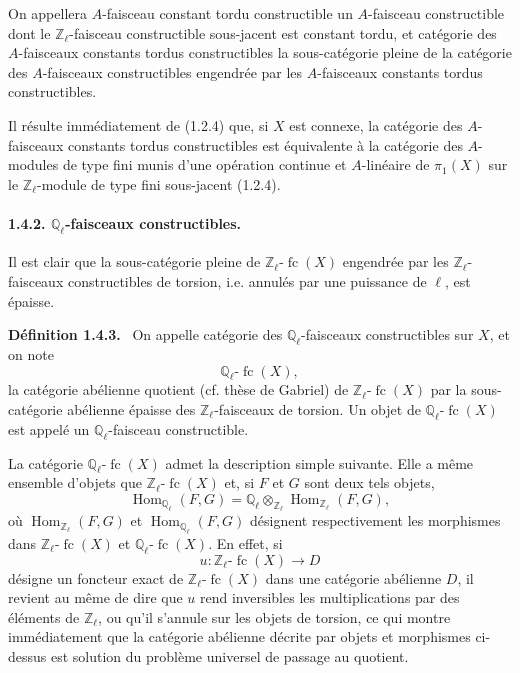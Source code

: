 \documentclass[11pt]{article}
\newenvironment{statement}[1]{\par\medskip\noindent\textbf{#1.}\ }{\par\medskip}
\DeclareMathOperator{\Hom}{Hom}
\providecommand{\Hom}{\operatorname{Hom}}
\providecommand{\fc}{\operatorname{fc}}
\providecommand{\Hom}{\operatorname{Hom}}
\begin{document}
On appellera \(A\)-faisceau constant tordu constructible un \(A\)-faisceau constructible dont le \(\mathbb Z_\ell\)-faisceau constructible sous-jacent est constant tordu, et catégorie des \(A\)-faisceaux constants tordus constructibles la sous-catégorie pleine de la catégorie des \(A\)-faisceaux constructibles engendrée par les \(A\)-faisceaux constants tordus constructibles.

Il résulte immédiatement de (1.2.4) que, si \(X\) est connexe, la catégorie des \(A\)-faisceaux constants tordus constructibles est équivalente à la catégorie des \(A\)-modules de type fini munis d'une opération continue et \(A\)-linéaire de \(\pi_1(X)\) sur le \(\mathbb Z_\ell\)-module de type fini sous-jacent (1.2.4).

\paragraph{1.4.2. \(\mathbb Q_\ell\)-faisceaux constructibles.}
Il est clair que la sous-catégorie pleine de \(\mathbb Z_\ell\text{-}\fc(X)\) engendrée par les \(\mathbb Z_\ell\)-faisceaux constructibles de torsion, i.e. annulés par une puissance de \(\ell\), est épaisse.

\begin{statement}{Définition 1.4.3}
On appelle catégorie des \(\mathbb Q_\ell\)-faisceaux constructibles sur \(X\), et on note
\[
\mathbb Q_\ell\text{-}\fc(X),
\]
la catégorie abélienne quotient (cf. thèse de Gabriel) de \(\mathbb Z_\ell\text{-}\fc(X)\) par la sous-catégorie abélienne épaisse des \(\mathbb Z_\ell\)-faisceaux de torsion. Un objet de \(\mathbb Q_\ell\text{-}\fc(X)\) est appelé un \(\mathbb Q_\ell\)-faisceau constructible.
\end{statement}

La catégorie \(\mathbb Q_\ell\text{-}\fc(X)\) admet la description simple suivante. Elle a même ensemble d'objets que \(\mathbb Z_\ell\text{-}\fc(X)\) et, si \(F\) et \(G\) sont deux tels objets,
\[
\Hom_{\mathbb Q_\ell}(F,G)
=\mathbb Q_\ell\otimes_{\mathbb Z_\ell}\Hom_{\mathbb Z_\ell}(F,G),
\]
où \(\Hom_{\mathbb Z_\ell}(F,G)\) et \(\Hom_{\mathbb Q_\ell}(F,G)\) désignent respectivement les morphismes dans \(\mathbb Z_\ell\text{-}\fc(X)\) et \(\mathbb Q_\ell\text{-}\fc(X)\). En effet, si
\[
u:\mathbb Z_\ell\text{-}\fc(X)\longrightarrow D
\]
désigne un foncteur exact de \(\mathbb Z_\ell\text{-}\fc(X)\) dans une catégorie abélienne \(D\), il revient au même de dire que \(u\) rend inversibles les multiplications par des éléments de \(\mathbb Z_\ell\), ou qu'il s'annule sur les objets de torsion, ce qui montre immédiatement que la catégorie abélienne décrite par objets et morphismes ci-dessus est solution du problème universel de passage au quotient.
\end{document}
